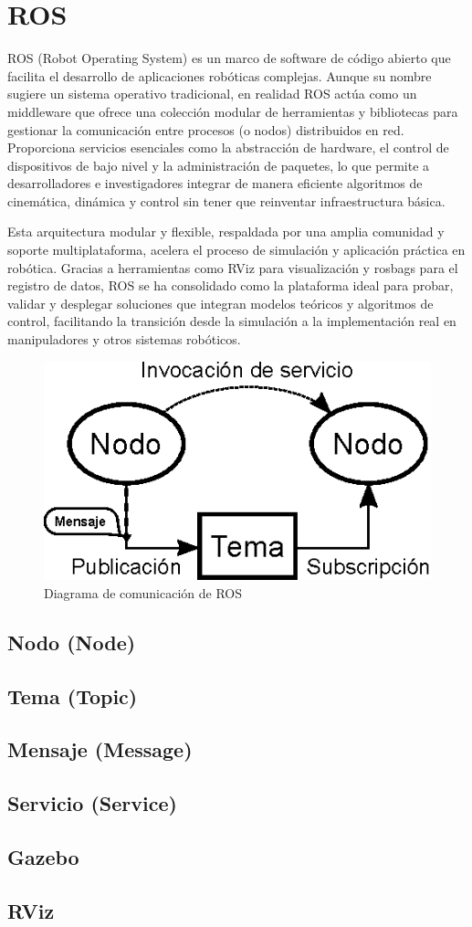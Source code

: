 \section{ROS} \label{sec:ros}
ROS (Robot Operating System) es un marco de software de código abierto que facilita el desarrollo de aplicaciones robóticas complejas. Aunque su nombre sugiere un sistema operativo tradicional, en realidad ROS actúa como un middleware que ofrece una colección modular de herramientas y bibliotecas para gestionar la comunicación entre procesos (o nodos) distribuidos en red. Proporciona servicios esenciales como la abstracción de hardware, el control de dispositivos de bajo nivel y la administración de paquetes, lo que permite a desarrolladores e investigadores integrar de manera eficiente algoritmos de cinemática, dinámica y control sin tener que reinventar infraestructura básica.

Esta arquitectura modular y flexible, respaldada por una amplia comunidad y soporte multiplataforma, acelera el proceso de simulación y aplicación práctica en robótica. Gracias a herramientas como RViz para visualización y rosbags para el registro de datos, ROS se ha consolidado como la plataforma ideal para probar, validar y desplegar soluciones que integran modelos teóricos y algoritmos de control, facilitando la transición desde la simulación a la implementación real en manipuladores y otros sistemas robóticos.
\begin{figure}[h]
	\centering
	\includegraphics[width=0.5\linewidth]{img/ROS_concepts}
	\caption{Diagrama de comunicación de ROS}
	\label{fig:rosconcepts}
\end{figure}


\subsection{Nodo (Node)}
\subsection{Tema (Topic)}
\subsection{Mensaje (Message)}
\subsection{Servicio (Service)}
\subsection{Gazebo}
\subsection{RViz}
